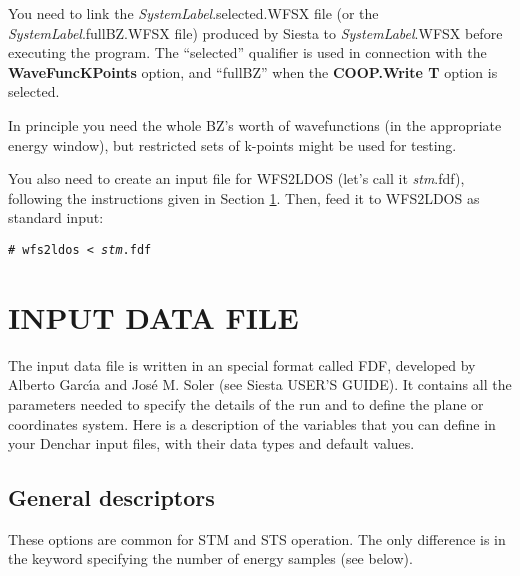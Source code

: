  You need to link the {\it SystemLabel}.selected.WFSX file (or the
 {\it SystemLabel}.fullBZ.WFSX file) produced by {\sc Siesta} to {\it
   SystemLabel}.WFSX before executing the program. The ``selected''
 qualifier is used in connection with the {\bf WaveFuncKPoints}
 option, and ``fullBZ'' when the {\bf COOP.Write T} option is
 selected.

 In principle you need the whole BZ's worth of wavefunctions (in the
 appropriate energy window), but restricted sets of k-points might be
 used for testing.

 You also need to create an input file for {\sc WFS2LDOS} (let's call
 it {\it stm}.fdf), following the instructions given in Section
 \ref{cap:input}. Then, feed it to {\sc WFS2LDOS} as standard input:

 {\tt \# wfs2ldos < {\it stm}.fdf } 

\section{INPUT DATA FILE}
\label{cap:input} 

The input data file is written in an special format called FDF, developed
by Alberto Garc\'{\i}a and Jos\'e M. Soler (see {\sc Siesta} USER'S GUIDE).
It contains all the parameters needed to specify the details
of the run and to define the plane or coordinates system.
Here is a description of the variables that you can define in your 
{\sc Denchar} input files,
with their data types and default values.

\vspace{5pt}
\subsection{General descriptors}

These options are common for STM and STS operation. The only
difference is in the keyword specifying the number of energy samples
(see below).


